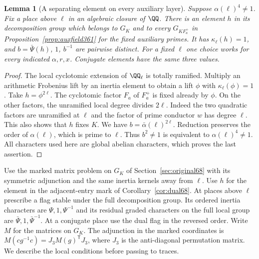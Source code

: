 \documentclass[a4paper,11pt]{article}
\newtheorem{lemma}[proposition]{Lemma}
\theoremstyle{definition}
\theoremstyle{remark}
\numberwithin{equation}{section}
\begin{document}
\begin{lemma}[A separating element on every auxiliary layer]\leavevmode
\label{lem:onefrobenius435}
Suppose \(\alpha(\ell)^4\ne1\). Fix a place above \(\ell\)
in an algebraic closure of \(\QQ\). There is an element \(h\)
in its decomposition group which belongs to \(G_K\) and to
every \(G_{KF_a^+}\) in Proposition~\ref{prop:auxfield361}
for the fixed auxiliary primes. It has \(\kappa_\ell(h)=1\),
and \(b=\bar\Psi(h)\), \(1\), \(b^{-1}\) are pairwise distinct.
For a fixed \(\ell\) one choice works for every indicated
\(\alpha,r,x\). Conjugate elements have the same three values.
\end{lemma}
\begin{proof}
The local cyclotomic extension of \(\QQ_\ell\) is totally
ramified. Multiply an arithmetic Frobenius lift by an inertia
element to obtain a lift \(\phi\) with \(\kappa_\ell(\phi)=1\).
Take \(h=\phi^{2\ell}\). The cyclotomic factor \(F_a\) of
\(F_a^+\) is fixed already by \(\phi\). On the other factors,
the unramified local degree divides \(2\ell\). Indeed the two
quadratic factors are unramified at \(\ell\) and the factor of
prime conductor \(w\) has degree \(\ell\). This also shows that
\(h\) fixes \(K\). We have \(b=\bar\alpha(\ell)^{2\ell}\).
Reduction preserves the order of \(\alpha(\ell)\), which is
prime to \(\ell\). Thus \(b^2\ne1\) is equivalent to
\(\alpha(\ell)^4\ne1\). All characters used here are global
abelian characters, which proves the last assertion.
\end{proof}

Use the marked matrix problem on \(G_K\) of
Section~\ref{sec:original68} with its symmetric adjunction and
the same inertia kernels away from \(\ell\). Use \(h\) for the
element in the adjacent-entry mark of Corollary~\ref{cor:dual68}.
At places above
\(\ell\) prescribe a flag stable under the full decomposition
group. Its ordered inertia characters are \(\Psi,1,\Psi^{-1}\)
and its residual graded characters on the full local group
are \(\bar\Psi,1,\bar\Psi^{-1}\). At a conjugate place use
the dual flag in the reversed order. Write \(M\) for the
matrices on \(G_K\). The adjunction in the marked coordinates is
\(M(cg^{-1}c)=J_3 M(g)^{\mathsf T}J_3\), where \(J_3\) is
the anti-diagonal permutation matrix. We describe the local
conditions before passing to traces.
\end{document}
